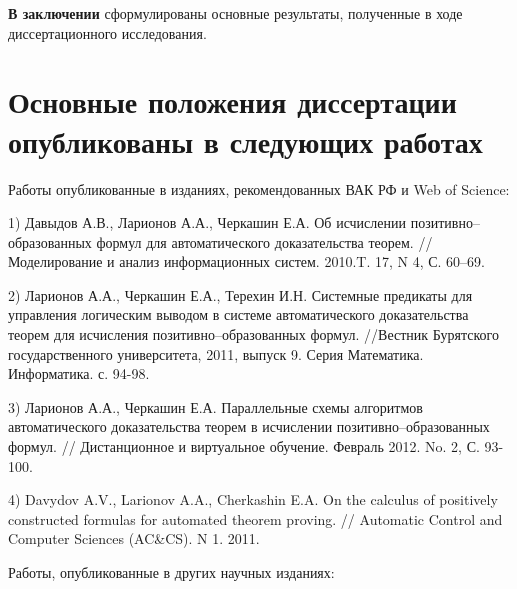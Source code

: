 \documentclass[a4paper]{report}
\begin{document}


\textbf{В заключении} сформулированы основные результаты, полученные в ходе диссертационного исследования.



\section*{Основные положения диссертации опубликованы в следующих работах}

Работы опубликованные в изданиях, рекомендованных ВАК РФ и Web of Science:

1) Давыдов А.В., Ларионов А.А., Черкашин Е.А. Об исчислении
позитивно--образованных формул для автоматического доказательства
теорем. // Моделирование и анализ информационных систем. 2010.T. 17, N
4, С. 60--69.

2) Ларионов А.А., Черкашин Е.А., Терехин И.Н. Системные предикаты для
управления логическим выводом в системе автоматического доказательства
теорем для исчисления позитивно--образованных формул. //Вестник
Бурятского государственного университета, 2011, выпуск 9. Серия
Математика. Информатика. с. 94-98.

3) Ларионов А.А., Черкашин Е.А. Параллельные схемы алгоритмов
автоматического доказательства теорем в исчислении
позитивно--образованных формул. // Дистанционное и виртуальное
обучение. Февраль 2012. No. 2, С. 93-100.

4) Davydov A.V., Larionov A.A., Cherkashin E.A. On the calculus of
positively constructed formulas for automated theorem proving. //
Automatic Control and Computer Sciences (AC\&CS). N 1. 2011.

Работы, опубликованные в других научных изданиях:
\end{document}
